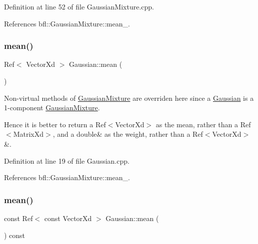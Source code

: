 Definition at line 52 of file Gaussian\+Mixture.\+cpp.



References bfl\+::\+Gaussian\+Mixture\+::mean\+\_\+.

\mbox{\label{classbfl_1_1Gaussian_a31c06392bcbcc31d576e148001b681a0}} 
\subsubsection{\texorpdfstring{mean()}{mean()}\hspace{0.1cm}{\footnotesize\ttfamily [2/6]}}
{\footnotesize\ttfamily Ref$<$ Vector\+Xd $>$ Gaussian\+::mean (\begin{DoxyParamCaption}{ }\end{DoxyParamCaption})}



Non-\/virtual methods of \mbox{\hyperlink{classbfl_1_1GaussianMixture}{Gaussian\+Mixture}} are overriden here since a \mbox{\hyperlink{classbfl_1_1Gaussian}{Gaussian}} is a 1-\/component \mbox{\hyperlink{classbfl_1_1GaussianMixture}{Gaussian\+Mixture}}. 

Hence it is better to return a Ref$<$\+Vector\+Xd$>$ as the mean, rather than a Ref$<$\+Matrix\+Xd$>$, and a double\& as the weight, rather than a Ref$<$\+Vector\+Xd$>$\&. 

Definition at line 19 of file Gaussian.\+cpp.



References bfl\+::\+Gaussian\+Mixture\+::mean\+\_\+.

\mbox{\label{classbfl_1_1Gaussian_a1b9b1727e467cc671cbf5487c00c9b20}} 
\subsubsection{\texorpdfstring{mean()}{mean()}\hspace{0.1cm}{\footnotesize\ttfamily [3/6]}}
{\footnotesize\ttfamily const Ref$<$ const Vector\+Xd $>$ Gaussian\+::mean (\begin{DoxyParamCaption}{ }\end{DoxyParamCaption}) const}



